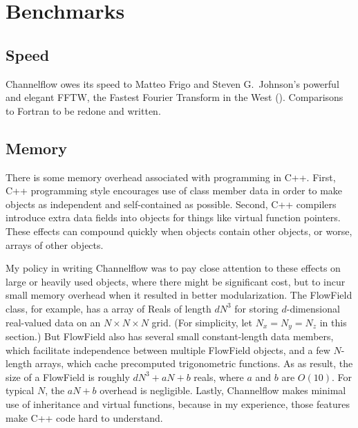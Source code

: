\documentclass{article}[12pt]
\begin{document}
\section{Benchmarks}

\subsection{Speed}
\label{sec:speed_benchmarks}

Channelflow owes its speed to Matteo Frigo and Steven G.\ Johnson's
powerful and elegant FFTW, the Fastest Fourier Transform in the West
(\cite{Frigo98}). Comparisons to Fortran to be redone and written.

\subsection{Memory}
\label{sec:memory_benchmarks}

There is some memory overhead associated with programming in C++.
First, C++ programming style encourages use of class member data
in order to make objects as independent and self-contained as possible.
Second, C++ compilers introduce extra data fields into objects for
things like virtual function pointers. These effects can compound
quickly when objects contain other objects, or worse, arrays of other
objects.

My policy in writing Channelflow was to pay close attention to these
effects on large or heavily used objects, where there might be significant
cost, but to incur small memory overhead when it resulted in better
modularization. The FlowField class, for example, has a array of
Reals of length $dN^3$ for storing $d$-dimensional real-valued data on
an $N \times N \times N$ grid. (For simplicity, let $N_x = N_y = N_z$ in
this section.) But FlowField also has several small constant-length data
members, which facilitate independence between multiple FlowField objects,
and a few $N$-length arrays, which cache precomputed trigonometric
functions. As as result, the size of a FlowField is roughly
$d N^3 + a N + b$ reals, where $a$ and $b$ are $O(10)$. For typical
$N$, the $a N + b$ overhead is negligible. Lastly, Channelflow makes
minimal use of inheritance and virtual functions, because in my
experience, those features make C++ code hard to understand.
\end{document}
